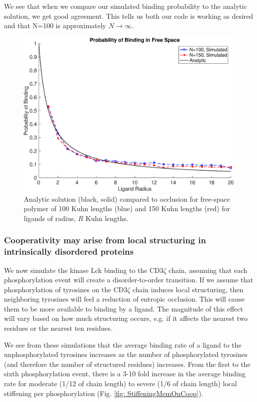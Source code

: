 \documentclass[../../AdvancementSummary.tex]{subfiles}
\begin{document}
 We see that when we compare our simulated binding probability to the analytic solution, we get good agreement. This tells us both our code is working as desired and that N=100 is approximately $N \rightarrow \infty$.

 \begin{figure}[H]
 \begin{center}
 \includegraphics[width=0.7\linewidth]{ResultsFigures/General/Analytic/BindingVSAnalyticN100N150.eps}
 \end{center}
  \caption{Analytic solution (black, solid) compared to occlusion for free-space polymer of 100 Kuhn lengths (blue) and 150 Kuhn lengths (red) for ligands of radius, $R$ Kuhn lengths. \label{fig: AnalyticBinding}}
 \end{figure}



\subsubsection{Cooperativity may arise from local structuring in intrinsically disordered proteins}

We now simulate the kinase Lck binding to the CD3$\zeta$ chain, assuming that each phosphorylation event will create a disorder-to-order transition. If we assume that phosphorylation of tyrosines on the CD3$\zeta$ chain induces local structuring, then neighboring tyrosines will feel a reduction of entropic occlusion. This will cause them to be more available to binding by a ligand. The magnitude of this effect will vary based on how much structuring occurs, e.g. if it affects the nearest two residues or the nearest ten residues. 

We see from these simulations that the average binding rate of a ligand to the unphosphorylated tyrosines increases as the number of phosphorylated tyrosines (and therefore the number of structured residues) increases. From the first to the sixth phosphorylation event, there is a 3-10 fold increase in the average binding rate for moderate (1/12 of chain length) to severe (1/6 of chain length) local stiffening per phosphorylation (Fig. \ref{fig: StiffeningMemOnCoop}).
\end{document}
